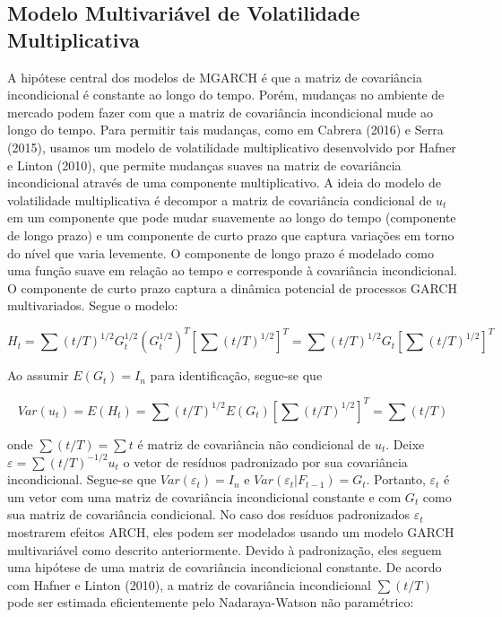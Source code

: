 \documentclass[a4paper,12pt] {article}
\begin{document}
	
	 \subsection{Modelo Multivariável de Volatilidade Multiplicativa}	
	
	A hipótese central dos modelos de MGARCH é que a matriz de covariância incondicional é constante ao longo do tempo. Porém, mudanças no ambiente de mercado  podem fazer com que a matriz de covariância incondicional mude ao longo do tempo. Para permitir tais mudanças, como em Cabrera (2016) e Serra (2015),  usamos  um modelo de volatilidade multiplicativo desenvolvido por Hafner e Linton (2010), que permite mudanças suaves na matriz de covariância incondicional através de uma componente multiplicativo. A ideia do modelo de volatilidade multiplicativa é decompor a matriz de covariância condicional de $u_t$ em um componente que pode mudar suavemente ao longo do tempo (componente de longo prazo) e um componente  de curto prazo que captura variações em torno do nível que varia levemente. O componente de longo prazo é modelado como uma função suave em relação ao tempo e corresponde à covariância incondicional. O componente de curto prazo captura a dinâmica potencial de processos GARCH multivariados. Segue o modelo:
	
	\begin{equation}
	H_t=\sum (t/T)^{1/2} G_t^ {1/2} (G_t^{1/2})^T [\sum (t/T)^{1/2}]^T=\sum (t/T)^{1/2} G_t[\sum(t/T)^{1/2}]^T
	\end{equation}
	
	Ao assumir $E (G_t) = I_n$ para identificação, segue-se que
 	
 	\begin{equation}
 	Var(u_t)= E(H_t)= \sum (t/T)^{1/2} E(G_t)[\sum (t/T)^{1/2}]^T=\sum (t/T)
 	\end{equation}
 	
 	onde $\sum (t/T)=\sum{t}$ é matriz de covariância não condicional de $u_t$. Deixe $\varepsilon=\sum (t/T)^{-1/2}u_t$  o vetor de resíduos padronizado por sua covariância incondicional. Segue-se que $Var (\varepsilon_t) = I_n$ e $Var (\varepsilon_t | F_{t - 1}) = G_t$. Portanto, $\varepsilon_t$ é um vetor com uma matriz de covariância incondicional constante e com $G_t$ como sua matriz de covariância condicional. No caso dos resíduos padronizados $\varepsilon_t$ mostrarem efeitos ARCH, eles podem ser modelados usando um modelo GARCH multivariável como descrito anteriormente. Devido à padronização, eles seguem uma hipótese de uma matriz de covariância incondicional constante. De acordo com Hafner e Linton (2010), a matriz de covariância incondicional $\sum (t/T)$ pode ser estimada eficientemente pelo Nadaraya-Watson não paramétrico:
 	
\end{document}

